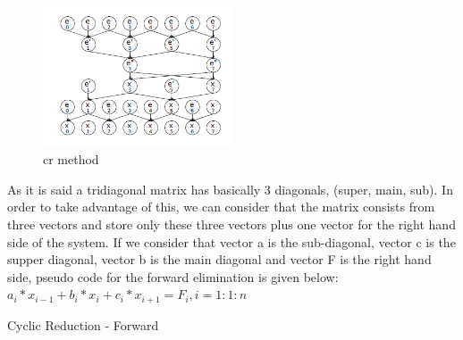 \begin{figure}[h]
   \centering
       \includegraphics[width=0.5\textwidth]{cr}
   \caption{cr method}
   \label{fig:gpuarch}
\end{figure}
As it is said a tridiagonal matrix has basically 3 diagonals, (super, main, sub). In order to take advantage of this, we can consider that the matrix consists from three vectors and store only these three vectors plus one vector for the right hand side of the system.
If we consider that vector a is the sub-diagonal, vector c is the supper diagonal, vector b is the main diagonal and vector F is the right hand side, pseudo code for the forward elimination is given below: \\
$a_i*x_{i-1} + b_i*x_i+c_i*x_{i+1} = F_{i}  ,   i=1:1:n$
\begin{algorithm}[H]
\begin{algorithmic}[1]
        \State{\hspace*{2cm}\}}
      \State{\}} 
\EndFunction
\end{algorithmic}
\caption{Cyclic Reduction - Forward}
\label{alg:forward_cr}
\end{algorithm}
